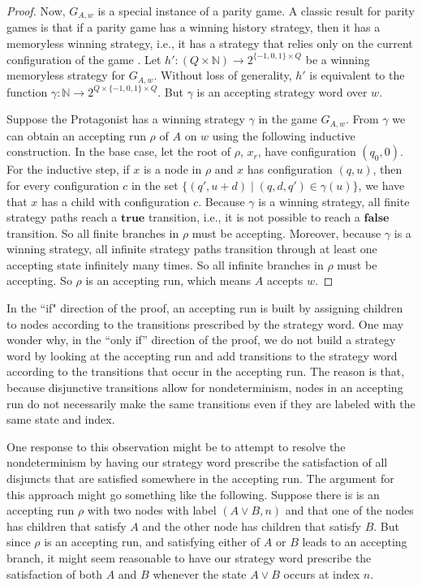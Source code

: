 \documentclass[10pt,a4paper]{amsart}
\theoremstyle{plain}
\theoremstyle{definition}
\theoremstyle{definition}
\DeclareMathOperator{\?}{?}
\begin{document}
\begin{proof}
    Now, $G_{A,w}$ is a special instance of a parity game. A classic result for parity games
    is that if a parity game has a winning history strategy,
    then it has a memoryless winning strategy, i.e., it has a strategy that relies only on the current
    configuration of the game \cite{emersonandjutla}. Let
    $h' : (Q \times \mathbb{N}) \rightarrow 2^{\{-1,0,1\} \times Q}$ be a winning memoryless strategy for $G_{A,w}$.
    Without loss of generality, $h'$ is equivalent to the function $\gamma : \mathbb{N} \rightarrow 2^{Q \times \{-1,0,1\} \times Q}$.
    But $\gamma$ is an accepting strategy word over $w$.

    Suppose the Protagonist has a winning strategy $\gamma$ in the game $G_{A,w}$. From $\gamma$ we can obtain an accepting
    run $\rho$ of $A$ on $w$ using the following inductive construction.
    In the base case, let the root of $\rho$, $x_r$, have configuration $(q_0,0)$. For the inductive step,
    if $x$ is a node in $\rho$ and
    $x$ has configuration $(q,u)$, then for every configuration $c$ in the set $\{ (q',u+d) \mid (q,d,q') \in \gamma(u) \}$, we have that
    $x$ has a child with configuration $c$. Because $\gamma$ is a winning strategy, all finite strategy paths reach a $\textbf{true}$ transition,
    i.e., it is not possible to reach a $\textbf{false}$ transition. So all finite branches in $\rho$ must be accepting.
    Moreover, because $\gamma$ is a winning strategy, all infinite strategy paths transition through at least one accepting state infinitely many times.
    So all infinite branches in $\rho$ must be accepting. So $\rho$ is an accepting run, which means $A$ accepts $w$.
\end{proof}

In the ``if" direction of the proof,
an accepting run is built by assigning children to nodes according to the transitions prescribed by
the strategy word. One may wonder why, in the ``only if'' direction of the proof, we do not build a strategy word by looking at the accepting run
and add transitions to the strategy word according to the transitions that occur in the accepting run.
The reason is that, because disjunctive transitions allow for nondeterminism,
nodes in an accepting run do not necessarily make
the same transitions even if they are labeled with the same state and index.

One response to this observation might be to attempt to resolve the nondeterminism by having our
strategy word prescribe the satisfaction of all disjuncts that are satisfied somewhere in the
accepting run. The argument for this approach might go something like the following. Suppose there is is an accepting
run $\rho$ with two nodes with label $(A \vee B, n)$ and that one of the nodes has children that satisfy $A$ and the other
node has children that satisfy $B$. But since $\rho$ is an accepting run, and satisfying
either of $A$ or $B$ leads to an accepting branch, it might seem reasonable to have our strategy word prescribe
the satisfaction of both $A$ and $B$ whenever the state $A \vee B$ occurs at index $n$.
\end{document}
